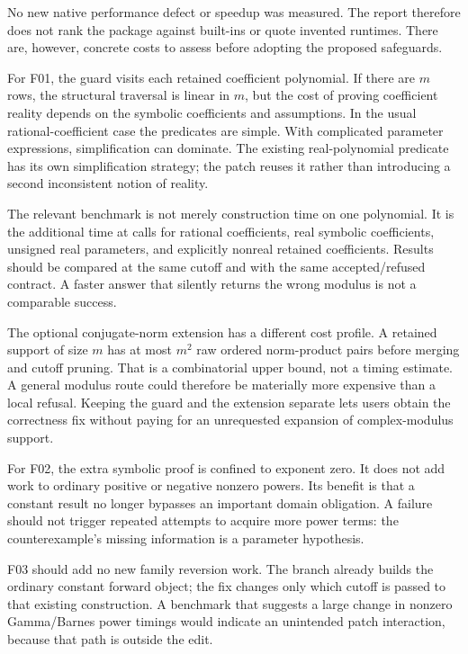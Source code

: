 \documentclass[11pt,letterpaper]{article}
\newcommand{\code}[1]{\texttt{\detokenize{#1}}}
\begin{document}
No new native performance defect or speedup was measured. The report therefore does not rank the package against built-ins or quote invented runtimes. There are, however, concrete costs to assess before adopting the proposed safeguards.

For F01, the guard visits each retained coefficient polynomial. If there are $m$ rows, the structural traversal is linear in $m$, but the cost of proving coefficient reality depends on the symbolic coefficients and assumptions. In the usual rational-coefficient case the predicates are simple. With complicated parameter expressions, simplification can dominate. The existing real-polynomial predicate has its own simplification strategy; the patch reuses it rather than introducing a second inconsistent notion of reality.\cite{core}

The relevant benchmark is not merely construction time on one polynomial. It is the additional time at \code{Abs} calls for rational coefficients, real symbolic coefficients, unsigned real parameters, and explicitly nonreal retained coefficients. Results should be compared at the same cutoff and with the same accepted/refused contract. A faster answer that silently returns the wrong modulus is not a comparable success.

The optional conjugate-norm extension has a different cost profile. A retained support of size $m$ has at most $m^2$ raw ordered norm-product pairs before merging and cutoff pruning. That is a combinatorial upper bound, not a timing estimate. A general modulus route could therefore be materially more expensive than a local refusal. Keeping the guard and the extension separate lets users obtain the correctness fix without paying for an unrequested expansion of complex-modulus support.

For F02, the extra symbolic proof is confined to exponent zero. It does not add work to ordinary positive or negative nonzero powers. Its benefit is that a constant result no longer bypasses an important domain obligation. A failure should not trigger repeated attempts to acquire more power terms: the counterexample's missing information is a parameter hypothesis.

F03 should add no new family reversion work. The branch already builds the ordinary constant forward object; the fix changes only which cutoff is passed to that existing construction. A benchmark that suggests a large change in nonzero Gamma/Barnes power timings would indicate an unintended patch interaction, because that path is outside the edit.
\end{document}
